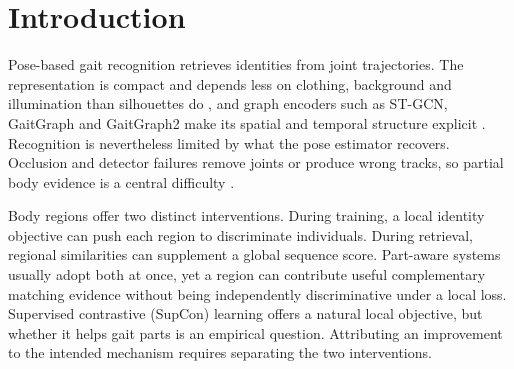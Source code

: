\documentclass[review,12pt]{elsarticle}
\begin{document}
\linenumbers

\section{Introduction}
\label{sec:introduction}

Pose-based gait recognition retrieves identities from joint trajectories. The
representation is compact and depends less on clothing, background and
illumination than silhouettes do \cite{liao2020posegait}, and graph encoders
such as ST-GCN, GaitGraph and GaitGraph2 make its spatial and temporal
structure explicit \cite{yan2018stgcn,teepe2021gaitgraph,teepe2022gaitgraph2}.
Recognition is nevertheless limited by what the pose estimator recovers.
Occlusion and detector failures remove joints or produce wrong tracks, so
partial body evidence is a central difficulty \cite{li2024survey,huang2024occluded}.

Body regions offer two distinct interventions. During training, a local
identity objective can push each region to discriminate individuals. During
retrieval, regional similarities can supplement a global sequence score.
Part-aware systems usually adopt both at once, yet a region can contribute
useful complementary matching evidence without being independently
discriminative under a local loss. Supervised contrastive (SupCon) learning
\cite{khosla2020supervised} offers a natural local objective, but whether it
helps gait parts is an empirical question. Attributing an improvement to the
intended mechanism requires separating the two interventions.
\end{document}
